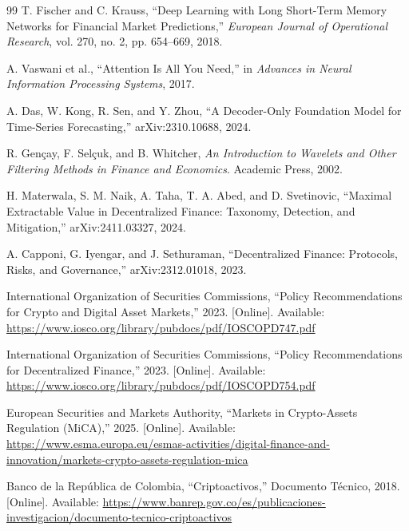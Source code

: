 \documentclass[12pt,oneside,letterpaper]{report}
\begin{document}
\begin{thebibliography}{99}
T. Fischer and C. Krauss, ``Deep Learning with Long Short-Term Memory Networks for Financial Market Predictions,'' \textit{European Journal of Operational Research}, vol. 270, no. 2, pp. 654--669, 2018.

A. Vaswani et al., ``Attention Is All You Need,'' in \textit{Advances in Neural Information Processing Systems}, 2017.

A. Das, W. Kong, R. Sen, and Y. Zhou, ``A Decoder-Only Foundation Model for Time-Series Forecasting,'' arXiv:2310.10688, 2024.

R. Gençay, F. Selçuk, and B. Whitcher, \textit{An Introduction to Wavelets and Other Filtering Methods in Finance and Economics}. Academic Press, 2002.

H. Materwala, S. M. Naik, A. Taha, T. A. Abed, and D. Svetinovic, ``Maximal Extractable Value in Decentralized Finance: Taxonomy, Detection, and Mitigation,'' arXiv:2411.03327, 2024.

A. Capponi, G. Iyengar, and J. Sethuraman, ``Decentralized Finance: Protocols, Risks, and Governance,'' arXiv:2312.01018, 2023.

International Organization of Securities Commissions, ``Policy Recommendations for Crypto and Digital Asset Markets,'' 2023. [Online]. Available: \url{https://www.iosco.org/library/pubdocs/pdf/IOSCOPD747.pdf}

International Organization of Securities Commissions, ``Policy Recommendations for Decentralized Finance,'' 2023. [Online]. Available: \url{https://www.iosco.org/library/pubdocs/pdf/IOSCOPD754.pdf}

European Securities and Markets Authority, ``Markets in Crypto-Assets Regulation (MiCA),'' 2025. [Online]. Available: \url{https://www.esma.europa.eu/esmas-activities/digital-finance-and-innovation/markets-crypto-assets-regulation-mica}

Banco de la República de Colombia, ``Criptoactivos,'' Documento Técnico, 2018. [Online]. Available: \url{https://www.banrep.gov.co/es/publicaciones-investigacion/documento-tecnico-criptoactivos}

\end{thebibliography}
\end{document}
